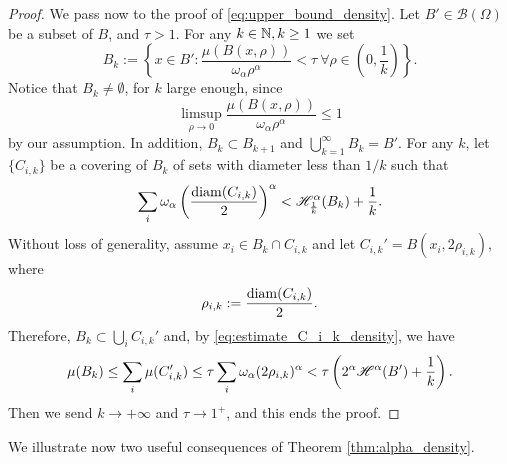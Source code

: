 \begin{proof}
\smallskip

We pass now to the proof of \eqref{eq:upper_bound_density}. Let $B' \in \mathcal{B}(\Omega)$ be a subset of $B$, and $\tau > 1$. For any $k \in \mathbb{N}, k \ge 1$ we set
\begin{equation*}
B_{k} := \left \{ x \in B' : \frac{\mu(B(x, \rho))}{\omega_{\alpha} \rho^{\alpha}} < \tau  \ \forall \rho \in \left (0, \frac{1}{k} \right ) \right \}. 
\end{equation*}
Notice that $B_{k} \neq \emptyset$, for $k$ large enough, since
\begin{equation*}
\limsup_{\rho \to 0} \frac{\mu(B(x, \rho))}{\omega_{\alpha} \rho^{\alpha}} \le 1 
\end{equation*}
by our assumption. In addition, $B_{k} \subset B_{k + 1}$ and $\bigcup_{k = 1}^{\infty} B_{k} = B'$. For any $k$, let $\{C_{i, k}\}$ be a covering of $B_{k}$ of sets with diameter less than $1/k$ such that
\begin{equation} \label{eq:estimate_C_i_k_density}
\sum_{i} \omega_{\alpha} \left ( \frac{{\rm diam}(C_{i, k})}{2} \right )^{\alpha} < \mathscr{H}^{\alpha}_{\frac{1}{k}}(B_{k}) + \frac{1}{k}.
\end{equation}
Without loss of generality, assume $x_{i} \in B_{k} \cap C_{i, k}$ and let $C_{i, k}' = B(x_{i}, 2 \rho_{i, k})$, where $$\rho_{i, k} := \frac{\operatorname{diam}(C_{i, k})}{2}.$$
Therefore, $B_{k} \subset \bigcup_{i} C_{i, k}'$ and, by \eqref{eq:estimate_C_i_k_density}, we have 
\begin{equation*}
\mu(B_{k}) \le \sum_{i} \mu(C_{i, k}') \le \tau \sum_{i} \omega_{\alpha} (2 \rho_{i, k})^{\alpha} < \tau \left ( 2^{\alpha} \mathscr{H}^{\alpha}(B') + \frac{1}{k} \right ).
\end{equation*}
Then we send $k \to + \infty$ and $\tau \to 1^{+}$, and this ends the proof.
\end{proof}

We illustrate now two useful consequences of Theorem \ref{thm:alpha_density}.


